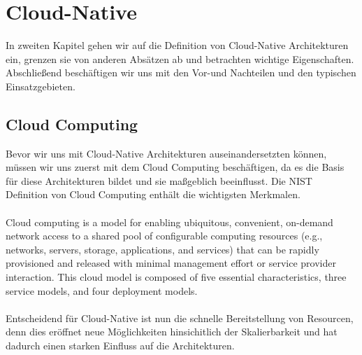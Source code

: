 \chapter{Cloud-Native}

In zweiten Kapitel gehen wir auf die Definition von Cloud-Native Architekturen ein, grenzen sie von anderen Absätzen ab und betrachten wichtige Eigenschaften. Abschließend beschäftigen wir uns mit den Vor-und Nachteilen und den typischen Einsatzgebieten.

\section{Cloud Computing}
Bevor wir uns mit Cloud-Native Architekturen auseinandersetzten können, müssen wir uns zuerst mit dem Cloud Computing beschäftigen, da es die Basis für diese Architekturen bildet und sie maßgeblich beeinflusst. Die NIST Definition von Cloud Computing enthält die wichtigsten Merkmalen.\\
\\
Cloud computing is a model for enabling ubiquitous, convenient, on-demand network access to a shared pool of configurable computing resources (e.g., networks, servers, storage, applications, and services) that can be rapidly provisioned and released with minimal management effort or service provider interaction. This cloud model is composed of five essential characteristics, three service models, and four deployment models.\\
\\
Entscheidend für Cloud-Native ist nun die schnelle Bereitstellung von Resourcen, denn dies eröffnet neue Möglichkeiten hinsichitlich der Skalierbarkeit und hat dadurch einen starken Einfluss auf die Architekturen.

